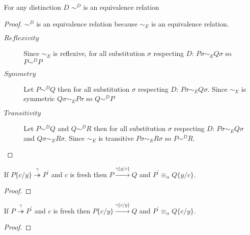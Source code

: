  
\begin{lemma}\label{strongDEquivalenceIsAnEquivalence}
  For any distinction $D$ $\sim^{D}$ is an equivalence relation
  \begin{proof}
    $\sim^{D}$ is an equivalence relation because $\sim_{E}$ is an equivalence relation.
    \begin{description}
      \item[$Reflexivity$]
	Since $\sim_{E}$ is reflexive, for all substitution $\sigma$ respecting $D$: $P\sigma \sim_{E} Q\sigma$ so $P \sim^{D} P$
      \item[$Symmetry$]
	Let $P \sim^{D} Q$ then for all substitution $\sigma$ respecting $D$: $P\sigma \sim_{E} Q\sigma$. Since $\sim_{E}$ is symmetric $Q\sigma \sim_{E} P\sigma$ so $Q \sim^{D} P$
      \item[$Transitivity$]
	Let $P \sim^{D} Q$ and $Q \sim^{D} R$ then for all substitution $\sigma$ respecting $D$: $P\sigma \sim_{E} Q\sigma$ and $Q\sigma \sim_{E} R\sigma$. Since $\sim_{E}$ is transitive $P\sigma \sim_{E} R\sigma$ so $P \sim^{D} R$.
    \end{description}
  \end{proof}
\end{lemma}

\begin{lemma}\label{pushSubstitution}
  If $P\{c/y\} \stackrel{\gamma}{\twoheadrightarrow} P^{'}$ and $c$ is fresh then $P \xrightarrow{\gamma\{y/c\}} Q$ and $P^{'}\equiv_{\alpha}Q\{y/c\}$.
  \begin{proof}
    
  \end{proof}
\end{lemma}

\begin{lemma}\label{substitutionOverTransition}
  If $P \stackrel{\gamma}{\twoheadrightarrow} P^{'}$ and $c$ is fresh then $P\{c/y\} \xrightarrow{\gamma\{c/y\}} Q$ and $P^{'}\equiv_{\alpha}Q\{c/y\}$.
  \begin{proof}
    
  \end{proof}
\end{lemma}



